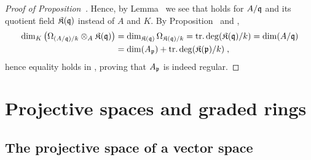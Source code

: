 \documentclass[a4paper,parskip=half,numbers=enddot, DIV=12, headheight=30pt]{scrreprt}
\begin{document}
\begin{proof}[Proof of Proposition~]
	Hence, by Lemma~ we see that  holds for $A/\mathfrak{q}$ and its quotient field $\mathfrak{K}(\mathfrak{q})$ instead of $A$ and $K$. By Proposition~ and \cite[Theorem~10]{alg2},
	\begin{align*}
		\dim_K\left(\Omega_{(A/\mathfrak{q})/k}\otimes_A\mathfrak{K}(\mathfrak{q})\right)&=\dim_{\mathfrak{K}(\mathfrak{q})}\Omega_{\mathfrak{K}(\mathfrak{q})/k}=\operatorname{tr.deg} (\mathfrak{K}(\mathfrak{q})/k)
		=\dim(A/\mathfrak{q})\\&=\dim(A_{\mathfrak{p}})+\operatorname{tr.deg}(\mathfrak{K}(\mathfrak{p})/k)\;,
	\end{align*}
	hence equality holds in , proving that $A_{\mathfrak{p}}$ is indeed regular.
\end{proof}

\chapter{Projective spaces and graded rings}


\section{The projective space of a vector space}
\end{document}
